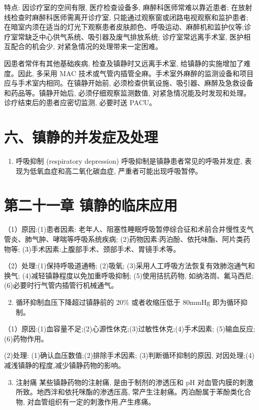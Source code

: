 \documentclass[10pt]{article}
\begin{document}
特点: 因诊疗室的空间有限, 医疗检查设备多, 麻醉科医师常难以靠近患者; 在放射线检查时麻醉科医师需离开诊疗室, 只能通过观察窗或闭路电视观察和监护患者; 在暗室内须在适当的灯光下观察患者皮肤颜色、呼吸运动、麻醉机和监护仪等;诊疗室常缺乏中心供气系统、吸引器及废气排放系统; 诊疗室常远离手术室, 医护相互配合的机会少, 对紧急情况的处理带来一定困难。

因患者常伴有其他基础疾病, 检查及镇静时又远离手术室, 给镇静的实施增加了难度。因此, 多采用 MAC 技术或气管内插管全麻。手术室外麻醉的监测设备和项目应与手术室内相同。在镇静开始前, 必须检查供氧设施、吸引器、麻醉及急救设备和药品等。镇静开始后, 必须仔细观察监测数值, 对紧急情况能及时发现和处理。诊疗结束后的患者应密切监测, 必要时送 PACU。

\section*{六、镇静的并发症及处理}
\begin{enumerate}
  \item 呼吸抑制 (respiratory depression) 呼吸抑制是镇静患者常见的呼吸并发症, 表现为低氧血症和高二氧化碳血症, 严重者可能出现呼吸暂停。
\end{enumerate}

\section*{第二十一章 镇静的临床应用}
（1）原因:(1)患者因素: 老年人、阻塞性睡眠呼吸暂停综合征和术前合并慢性支气管炎、肺气肿、哮喘等呼吸系统疾病; (2)药物因素:丙泊酚、依托味酯、阿片类药物等; (3)手术因素:上腹部手术、颈部手术、胃镜手术等。

（2）处理:(1)保持呼吸道通畅; (2)吸氧; (3)采用人工呼吸方法恢复有效肺泡通气和换气; (4)减轻镇静程度以免加重呼吸抑制; (5)使用拮抗药物, 如纳洛峝、氟马西尼; (6)必要时行气管内插管行机械通气。

\begin{enumerate}
  \setcounter{enumi}{1}
  \item 循环抑制血压下降超过镇静前的 $20 \%$ 或者收缩压低于 $80 \mathrm{mmHg}$ 即为循环抑制。
\end{enumerate}

（1）原因:(1)血容量不足;(2)心源性休克;(3)过敏性休克;(4)手术因素; (5)输血反应; (6)药物作用。

(2)处理: (1)确认血压数值;(2)排除手术因素; (3)判断循环抑制的原因, 对因处理;(4)减浅镇静的程度,减少镇静药物的影响。

\begin{enumerate}
  \setcounter{enumi}{2}
  \item 注射痛 某些镇静药物的注射痛, 是由于制剂的渗透压和 $\mathrm{pH}$ 对血管内膜的刺激所致。地西泮和依托咪酯的渗透压高, 常产生注射痛。丙泊酚属于苯酚类化合物, 对血管组织有一定的刺激作用,产生疼痛。
\end{enumerate}
\end{document}
